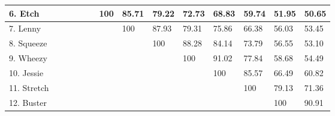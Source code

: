 \documentclass[a4paper, 12pt]{book}
\begin{document}
\begin{table}[htbp]
{\begin{tabular}{|l|l|l|l|l|l|l|l|l|l|l|l|l|l|}
		6. Etch      & \cellcolor[HTML]{000000} & \cellcolor[HTML]{000000} & \cellcolor[HTML]{000000} & \cellcolor[HTML]{000000} & \cellcolor[HTML]{000000} & 100                      & 85.71                    & 79.22                    & 72.73                    & 68.83                    & 59.74                    & 51.95                    & 50.65        \\ \hline
		7. Lenny     & \cellcolor[HTML]{000000} & \cellcolor[HTML]{000000} & \cellcolor[HTML]{000000} & \cellcolor[HTML]{000000} & \cellcolor[HTML]{000000} & \cellcolor[HTML]{000000} & 100                      & 87.93                    & 79.31                    & 75.86                    & 66.38                    & 56.03                    & 53.45        \\ \hline
		8. Squeeze   & \cellcolor[HTML]{000000} & \cellcolor[HTML]{000000} & \cellcolor[HTML]{000000} & \cellcolor[HTML]{000000} & \cellcolor[HTML]{000000} & \cellcolor[HTML]{000000} & \cellcolor[HTML]{000000} & 100                      & 88.28                    & 84.14                    & 73.79                    & 56.55                    & 53.10        \\ \hline
		9. Wheezy    & \cellcolor[HTML]{000000} & \cellcolor[HTML]{000000} & \cellcolor[HTML]{000000} & \cellcolor[HTML]{000000} & \cellcolor[HTML]{000000} & \cellcolor[HTML]{000000} & \cellcolor[HTML]{000000} & \cellcolor[HTML]{000000} & 100                      & 91.02                    & 77.84                    & 58.68                    & 54.49        \\ \hline
		10. Jessie   & \cellcolor[HTML]{000000} & \cellcolor[HTML]{000000} & \cellcolor[HTML]{000000} & \cellcolor[HTML]{000000} & \cellcolor[HTML]{000000} & \cellcolor[HTML]{000000} & \cellcolor[HTML]{000000} & \cellcolor[HTML]{000000} & \cellcolor[HTML]{000000} & 100                      & 85.57                    & 66.49                    & 60.82        \\ \hline
		11. Stretch  & \cellcolor[HTML]{000000} & \cellcolor[HTML]{000000} & \cellcolor[HTML]{000000} & \cellcolor[HTML]{000000} & \cellcolor[HTML]{000000} & \cellcolor[HTML]{000000} & \cellcolor[HTML]{000000} & \cellcolor[HTML]{000000} & \cellcolor[HTML]{000000} & \cellcolor[HTML]{000000} & 100                      & 79.13                    & 71.36        \\ \hline
		12. Buster   & \cellcolor[HTML]{000000} & \cellcolor[HTML]{000000} & \cellcolor[HTML]{000000} & \cellcolor[HTML]{000000} & \cellcolor[HTML]{000000} & \cellcolor[HTML]{000000} & \cellcolor[HTML]{000000} & \cellcolor[HTML]{000000} & \cellcolor[HTML]{000000} & \cellcolor[HTML]{000000} & \cellcolor[HTML]{000000} & 100                      & 90.91        \\ \hline

\end{tabular}}
\end{table}
\end{document}
